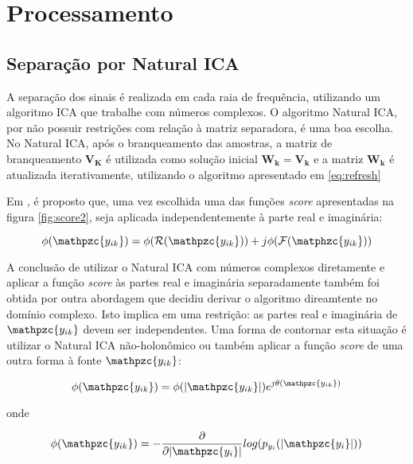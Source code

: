 \section{Processamento}

    \subsection{Separação por Natural ICA}
    
        A separação dos sinais é realizada em cada raia de frequência, utilizando um algoritmo ICA que trabalhe com números complexos. O algoritmo Natural ICA, por não possuir restrições com relação à matriz separadora, é uma boa escolha. No Natural ICA, após o branqueamento das amostras, a matriz de branqueamento $\mathbf{V_K}$ é utilizada como solução inicial $\mathbf{W_k = V_k}$ e a matriz $\mathbf{W_k}$ é atualizada iterativamente, utilizando o algoritmo apresentado em \ref{eq:refresh}
    
        Em \cite{real}, é proposto que, uma vez escolhida uma das funções \textit{score} apresentadas na figura \ref{fig:score2}, seja aplicada independentemente à parte real e imaginária:
        
        \begin{equation}
            \phi(\mathpzc{y_{ik}}) =\phi(\mathcal{R}(\mathpzc{y_{ik}})) + j\phi(\mathcal{F}(\matphzc{y_{ik}}))
        \end{equation}
    
        A conclusão de utilizar o Natural ICA com números complexos diretamente e aplicar a função \textit{score} às partes real e imaginária separadamente também foi obtida por outra abordagem que decidiu derivar o algoritmo direamtente no domínio complexo. Isto implica em uma restrição: as partes real e imaginária de $\mathpzc{y_{ik}}$ devem ser independentes. Uma forma de contornar esta situação é utilizar o Natural ICA não-holonômico ou também aplicar a função \textit{score} de uma outra forma à fonte $\mathpzc{y_{ik}}$:
        
        \begin{equation}
               \phi(\mathpzc{y_{ik}}) =\phi(|\mathpzc{y_{ik}}|)e^{j\theta(\mathpzc{y_{ik}})}
        \end{equation}
        
        onde 
        
        \begin{equation}
            \phi(\mathpzc{y_{ik}}) = - \frac{\partial}{\partial |\mathpzc{y_i}| }log(p_{y_i}(|\mathpzc{y_i}|))
        \end{equation}
        
